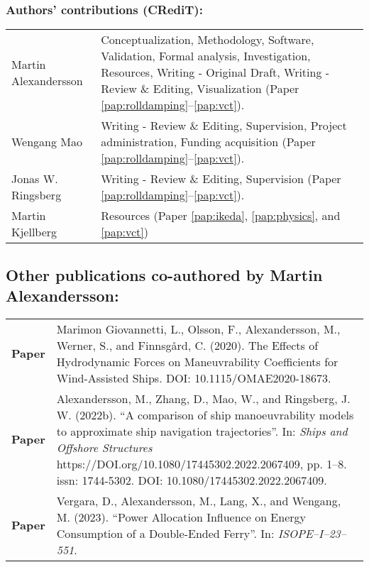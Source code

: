 \subsubsection*{Authors’ contributions (CRediT):} 
\begin{tabular}{p{} p{}}
     Martin Alexandersson & 
     Conceptualization, 
     Methodology, 
     Software, 
     Validation, 
     Formal analysis, 
     Investigation, 
     Resources, 
     Writing - Original Draft, 
     Writing - Review \& Editing, 
     Visualization (Paper \ref{pap:rolldamping}--\ref{pap:vct}).
     \vspace{0.25 cm}
     \\
     Wengang Mao &
     Writing - Review \& Editing, 
     Supervision,
     Project administration,
     Funding acquisition (Paper \ref{pap:rolldamping}--\ref{pap:vct}).
     \vspace{0.25 cm}
     \\
     Jonas W. Ringsberg &
     Writing - Review \& Editing, 
     Supervision  (Paper \ref{pap:rolldamping}--\ref{pap:vct}).
     \vspace{0.25 cm}
     \\
     Martin Kjellberg &
     Resources (Paper \ref{pap:ikeda}, \ref{pap:physics}, and \ref{pap:vct})
\end{tabular}



\newpage
\subsection*{\normalfont \color{black} \textbf{Other publications co-authored by Martin Alexandersson:}} 

\begin{tabular}{ l p{11.0cm} }
\textbf{Paper} & Marimon Giovannetti, L., Olsson, F., Alexandersson, M., Werner, S., and Finnsgård,
C. (2020). The Effects of Hydrodynamic Forces on Maneuvrability Coefficients for
Wind-Assisted Ships. DOI: 10.1115/OMAE2020-18673. \vspace{0.5cm} \\
\textbf{Paper} & Alexandersson, M., Zhang, D., Mao, W., and Ringsberg, J. W. (2022b). “A comparison of ship manoeuvrability models to approximate ship navigation trajectories”. In: \emph{Ships and Offshore Structures}
https://DOI.org/10.1080/17445302.2022.2067409, pp. 1–8. issn: 1744-5302. DOI:
10.1080/17445302.2022.2067409. \vspace{0.5cm} \\
\textbf{Paper} & Vergara, D., Alexandersson, M., Lang, X., and Wengang, M. (2023). “Power Allocation
Influence on Energy Consumption of a Double-Ended Ferry”. In: \emph{ISOPE–I–23–551}. \vspace{0.5cm} \\
\end{tabular}
